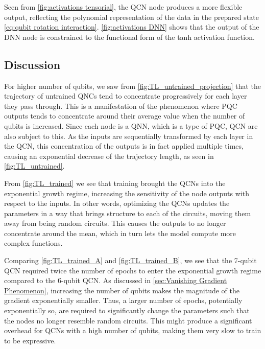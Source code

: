 Seen from \autoref{fig:activations tensorial}, the QCN node produces a more flexible output, reflecting the polynomial representation of the data in the prepared state \autoref{eq:qubit rotation interaction}. \autoref{fig:activations DNN} shows that the output of the DNN node is constrained to the functional form of the tanh activation function.   




\subsection{Discussion}\label{sec:Discussion Expressivity}

For higher number of qubits, we saw from \autoref{fig:TL_untrained_projection} that the trajectory of untrained QNCs tend to concentrate progressively for each layer they pass through. This is a manifestation of the phenomenon where PQC outputs tends to concentrate around their average value when the number of qubits is increased. Since each node is a QNN, which is a type of PQC, QCN are also subject to this. As the inputs are sequentially transformed by each layer in the QCN, this concentration of the outputs is in fact applied multiple times, causing an exponential decrease of the trajectory length, as seen in \autoref{fig:TL_untrained}.

From \autoref{fig:TL_trained} we see that training brought the QCNs into the exponential growth regime, increasing the sensitivity of the node outputs with respect to the inputs. In other words, optimizing the QCNs updates the parameters in a way that brings structure to each of the circuits, moving them away from being random circuits. This causes the outputs to no longer concentrate around the mean, which in turn lets the model compute more complex functions. 

Comparing \autoref{fig:TL_trained_A} and \autoref{fig:TL_trained_B}, we see that the 7-qubit QCN required twice the number of epochs to enter the exponential growth regime compared to the 6-qubit QCN. As discussed in \autoref{sec:Vanishing Gradient Phenomenon}, increasing the number of qubits makes the magnitude of the gradient exponentially smaller. Thus, a larger number of epochs, potentially exponentially so, are required to significantly change the parameters such that the nodes no longer resemble random circuits. This might produce a significant overhead for QCNs with a high number of qubits, making them very slow to train to be expressive.  

